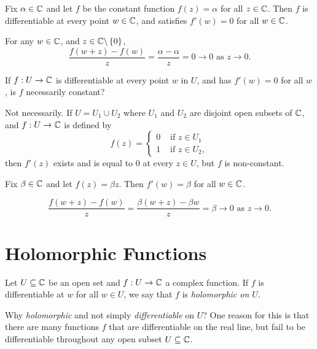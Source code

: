 \begin{example}
\label{e:diff4}
Fix $\alpha \in \mathbb{C}$ and let $f$ be the constant function $f(z) = \alpha$ for all $z \in \mathbb{C}$.  Then $f$ is differentiable at every point $w \in \mathbb{C}$, and satisfies $f'(w)=0$ for all $w \in \mathbb{C}$.
\end{example}
\begin{solution}
For any $w\in \mathbb{C}$, and $z \in \mathbb{C} \backslash \left\{0\right\}$,
\[
\frac{f(w+z)-f(w)}{z} = \frac{\alpha-\alpha}{z}=0 \to 0 \text{ as } z \to 0.
\]
\end{solution}

\begin{example}
If $f:U \to \mathbb{C}$ is differentiable at every point $w$ in $U$, and has $f'(w)=0$ for all $w$, is $f$ necessarily constant?
\end{example}

\begin{solution}
Not necessarily.  If $U=U_1 \cup U_2$ where $U_1$ and $U_2$ are disjoint open subsets of $\mathbb{C}$, and $f:U \to \mathbb{C}$ is defined by
\[
f(z) = \begin{cases}
0 & \text{ if } z \in U_1 \\
1& \text{ if } z \in U_2,
\end{cases}
\]
then $f'(z)$ exists and is equal to $0$ at every $z \in U$, but $f$ is non-constant.
\end{solution}

\begin{example}
\label{e:diff5}
Fix $\beta \in \mathbb{C}$ and let $f(z)=\beta z$.  Then $f'(w) = \beta$ for all $w \in \mathbb{C}$.
\end{example}

\begin{solution}
\[
\frac{f(w+z)-f(w)}{z} = \frac{\beta(w+z)-\beta w}{z}=\beta  \to 0 \text{ as } z \to 0.
\]
\end{solution}

\section{Holomorphic Functions}

\begin{definition}
Let $U \subseteq \mathbb{C}$ be an open set and $f:U \to \mathbb{C}$ a complex function.  If $f$ is differentiable at $w$ for all $w \in U$, we say that $f$ is \emph{holomorphic on $U$}.
\end{definition}
Why \emph{holomorphic} and not simply \emph{differentiable} on $U$?  One reason for this is that there are many functions $f$ that are differentiable on the real line, but fail to be differentiable throughout any open subset $U \subseteq \mathbb{C}$.


